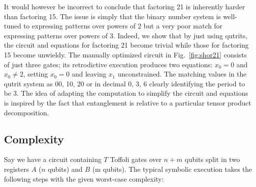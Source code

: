\documentclass[sigplan,review]{acmart}
\theoremstyle{definition}
\begin{document}
It would however be incorrect to conclude that factoring 21 is
inherently harder than factoring 15. The issue is simply that the
binary number system is well-tuned to expressing patterns over powers
of 2 but a very poor match for expressing patterns over powers of
3. Indeed, we show that by just using qutrits, the circuit and
equations for factoring 21 become trivial while those for factoring 15
become unwieldy. The manually optimized circuit in
Fig.~\ref{fig:shor21} consists of just three gates; its retrodictive
execution produces two equations: $x_0=0$ and $x_0 \neq 2$, setting
$x_0=0$ and leaving $x_1$ unconstrained. The matching values in the
qutrit system as 00, 10, 20 or in decimal 0, 3, 6 clearly identifying
the period to be 3. The idea of adapting the computation to simplify
the circuit and equations is inspired by the fact that entanglement is
relative to a particular tensor product decomposition.

\subsection{Complexity}

Say we have a circuit containing $T$ Toffoli gates over $n+m$ qubits
split in two registers $A$ ($n$ qubits) and $B$ (m qubits). The
typical symbolic execution takes the following steps with the given
worst-case complexity:
\end{document}
